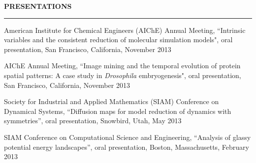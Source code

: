\documentclass[letterpaper,10pt]{article}
\newenvironment{itemize*}
  {\begin{itemize}
    \setlength{\parskip}{-3pt}}
  {\end{itemize}}
\newcommand{\cvheading}[1]{
\vspace{0.05in}
\noindent
\MakeUppercase{\bf #1}
\vspace{0.06in}
{\hrule height 0.3mm}
\vspace{0.06in}}
\begin{document}
\cvheading{Presentations}
\begin{itemize*}
\item American Institute for Chemical Engineers  (AIChE) Annual Meeting,  ``Intrinsic variables and the consistent reduction of molecular simulation models", oral presentation, San Francisco, California, November 2013
\item AIChE Annual Meeting,  ``Image mining and the temporal evolution of protein spatial patterns: A case study in {\it Drosophila} embryogenesis", oral presentation, San Francisco, California, November 2013
\item Society for Industrial and Applied Mathematics (SIAM) Conference on Dynamical Systems, ``Diffusion maps for model reduction of dynamics with symmetries'', oral presentation, Snowbird, Utah, May 2013
\item SIAM Conference on Computational Science and Engineering, ``Analysis of glassy potential energy landscapes'', oral presentation, Boston, Massachusetts, February 2013
\end{itemize*}

\end{document}
